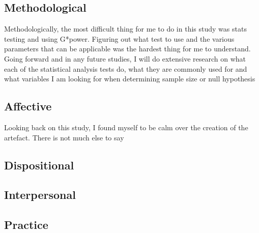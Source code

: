 \documentclass[conference]{IEEEtran}
\begin{document}

\subsection{Methodological}
Methodologically, the most difficult thing for me to do in this study was stats testing and using G*power. Figuring out what test to use and the various parameters that can be applicable was the hardest thing for me to understand. Going forward and in any future studies, I will do extensive research on what each of the statistical analysis tests do, what they are commonly used for and what variables I am looking for when determining sample size or null hypothesis

\subsection{Affective}
Looking back on this study, I found myself to be calm over the creation of the artefact. There is not much else to say
\subsection{Dispositional}
\subsection{Interpersonal}
\subsection{Practice}
\end{document}
